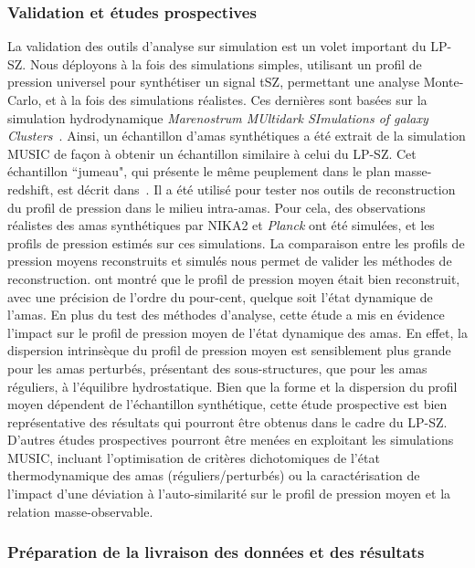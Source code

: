\subsubsection{Validation et études prospectives}

La validation des outils d'analyse sur simulation est un volet
important du LP-SZ. Nous déployons à la fois des simulations simples,
utilisant un profil de pression universel pour synthétiser un signal
tSZ, permettant une analyse Monte-Carlo, et à la fois des simulations
réalistes. Ces dernières sont basées sur la simulation hydrodynamique
\emph{Marenostrum MUltidark SImulations of galaxy
  Clusters}~\citep[MUSIC][]{Sembolini2013}. Ainsi, un échantillon
d'amas synthétiques a été extrait de la simulation MUSIC de façon à
obtenir un échantillon similaire à celui du LP-SZ. Cet échantillon
``jumeau", qui présente le même peuplement dans le plan
masse-redshift, est décrit dans~\citet{Ruppin2019a}. Il a été utilisé
pour tester nos outils de reconstruction du profil de pression dans le
milieu intra-amas. Pour cela, des observations réalistes des amas
synthétiques par NIKA2 et \emph{Planck} ont été simulées, et les
profils de pression estimés sur ces simulations. La comparaison entre
les profils de pression moyens reconstruits et simulés nous permet de
valider les méthodes de reconstruction. \citet{Ruppin2019a} ont montré
que le profil de pression moyen était bien reconstruit, avec une
précision de l'ordre du pour-cent, quelque soit l'état dynamique de
l'amas. En plus du test des méthodes d'analyse, cette étude a mis en
évidence l'impact sur le profil de pression moyen de l'état dynamique
des amas. En effet, la dispersion intrinsèque du profil de pression
moyen est sensiblement plus grande pour les amas perturbés, présentant
des sous-structures, que pour les amas réguliers, à l'équilibre
hydrostatique. Bien que la forme et la dispersion du profil moyen
dépendent de l'échantillon synthétique, cette étude prospective est
bien représentative des résultats qui pourront être obtenus dans le
cadre du LP-SZ. D'autres études prospectives pourront être menées en
exploitant les simulations MUSIC, incluant l'optimisation de critères
dichotomiques de l'état thermodynamique des amas
(réguliers/perturbés) ou la caractérisation de l'impact d'une déviation
à l'auto-similarité sur le profil de pression moyen et la relation
masse-observable.

\subsubsection{Préparation de la livraison des données et des résultats}

